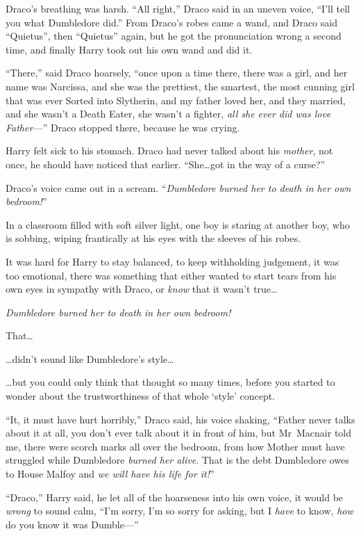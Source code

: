 Draco’s breathing was harsh. “All right,” Draco said in an uneven voice, “I’ll tell you what Dumbledore did.” From Draco’s robes came a wand, and Draco said “Quietus”, then “Quietus” again, but he got the pronunciation wrong a second time, and finally Harry took out his own wand and did it.

“There,” said Draco hoarsely, “once upon a time there, there was a girl, and her name was Narcissa, and she was the prettiest, the smartest, the most cunning girl that was ever Sorted into Slytherin, and my father loved her, and they married, and she wasn’t a Death Eater, she wasn’t a fighter, \emph{all she ever did was love Father—}” Draco stopped there, because he was crying.

Harry felt sick to his stomach. Draco had never talked about his \emph{mother}, not once, he should have noticed that earlier. “She…got in the way of a curse?”

Draco’s voice came out in a scream. “\emph{Dumbledore burned her to death in her own bedroom!}”

\later

In a classroom filled with soft silver light, one boy is staring at another boy, who is sobbing, wiping frantically at his eyes with the sleeves of his robes.

It was hard for Harry to stay balanced, to keep withholding judgement, it was too emotional, there was something that either wanted to start tears from his own eyes in sympathy with Draco, or \emph{know} that it wasn’t true…

\emph{Dumbledore burned her to death in her own bedroom!}

That…

…didn’t sound like Dumbledore’s style…

…but you could only think that thought so many times, before you started to wonder about the trustworthiness of that whole ‘style’ concept.

“It, it must have hurt horribly,” Draco said, his voice shaking, “Father never talks about it at all, you don’t ever talk about it in front of him, but Mr~Macnair told me, there were scorch marks all over the bedroom, from how Mother must have struggled while Dumbledore \emph{burned her alive}. That is the debt Dumbledore owes to House Malfoy and \emph{we will have his life for it!}”

“Draco,” Harry said, he let all of the hoarseness into his own voice, it would be \emph{wrong} to sound calm, “I’m sorry, I’m so sorry for asking, but I \emph{have} to know, \emph{how} do you know it was Dumble—”

